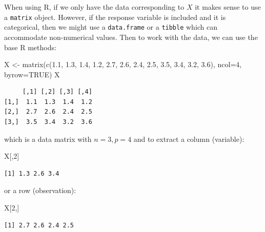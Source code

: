 \documentclass[
  letterpaper,
]{krantz}
\newenvironment{Shaded}{\begin{snugshade}}{\end{snugshade}}
\newcommand{\AttributeTok}[1]{\textcolor[rgb]{0.40,0.45,0.13}{#1}}
\newcommand{\ConstantTok}[1]{\textcolor[rgb]{0.56,0.35,0.01}{#1}}
\newcommand{\DecValTok}[1]{\textcolor[rgb]{0.68,0.00,0.00}{#1}}
\newcommand{\FloatTok}[1]{\textcolor[rgb]{0.68,0.00,0.00}{#1}}
\newcommand{\FunctionTok}[1]{\textcolor[rgb]{0.28,0.35,0.67}{#1}}
\newcommand{\NormalTok}[1]{\textcolor[rgb]{0.00,0.23,0.31}{#1}}
\newcommand{\OtherTok}[1]{\textcolor[rgb]{0.00,0.23,0.31}{#1}}
\begin{document}
When using R, if we only have the data corresponding to \(X\) it makes
sense to use a \texttt{matrix} object. However, if the response variable
is included and it is categorical, then we might use a
\texttt{data.frame} or a \texttt{tibble} which can accommodate
non-numerical values. Then to work with the data, we can use the base R
methods:

\begin{Shaded}
\begin{Highlighting}[]
\NormalTok{X }\OtherTok{\textless{}{-}} \FunctionTok{matrix}\NormalTok{(}\FunctionTok{c}\NormalTok{(}\FloatTok{1.1}\NormalTok{, }\FloatTok{1.3}\NormalTok{, }\FloatTok{1.4}\NormalTok{, }\FloatTok{1.2}\NormalTok{, }
              \FloatTok{2.7}\NormalTok{, }\FloatTok{2.6}\NormalTok{, }\FloatTok{2.4}\NormalTok{, }\FloatTok{2.5}\NormalTok{, }
              \FloatTok{3.5}\NormalTok{, }\FloatTok{3.4}\NormalTok{, }\FloatTok{3.2}\NormalTok{, }\FloatTok{3.6}\NormalTok{), }
            \AttributeTok{ncol=}\DecValTok{4}\NormalTok{, }\AttributeTok{byrow=}\ConstantTok{TRUE}\NormalTok{)}
\NormalTok{X}
\end{Highlighting}
\end{Shaded}

\begin{verbatim}
     [,1] [,2] [,3] [,4]
[1,]  1.1  1.3  1.4  1.2
[2,]  2.7  2.6  2.4  2.5
[3,]  3.5  3.4  3.2  3.6
\end{verbatim}

which is a data matrix with \(n=3, p=4\) and to extract a column
(variable):

\begin{Shaded}
\begin{Highlighting}[]
\NormalTok{X[,}\DecValTok{2}\NormalTok{]}
\end{Highlighting}
\end{Shaded}

\begin{verbatim}
[1] 1.3 2.6 3.4
\end{verbatim}

or a row (observation):

\begin{Shaded}
\begin{Highlighting}[]
\NormalTok{X[}\DecValTok{2}\NormalTok{,]}
\end{Highlighting}
\end{Shaded}

\begin{verbatim}
[1] 2.7 2.6 2.4 2.5
\end{verbatim}
\end{document}
